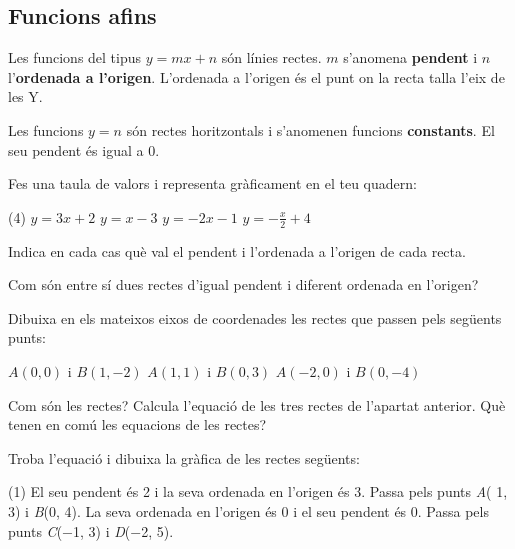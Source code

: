 \subsection{Funcions afins}	

\begin{theorybox}
	 Les funcions del tipus $y=mx+n$ són línies rectes. $m$ s'anomena \textbf{pendent} i $n$ l'\textbf{ordenada a l'origen}. L'ordenada a l'origen és el punt on la recta talla l'eix de les Y.
	
	Les funcions $y=n$ són rectes horitzontals i s'anomenen funcions \textbf{constants}.  El seu pendent és igual a 0.
	
\end{theorybox}

\begin{mylist}		
	\exer  Fes una taula de valors i representa gràficament en el teu quadern: 
	\begin{tasks}(4)
		\task \textbf{$y=3x+2$}
		\task \textbf{$y=x-3$}
		\task \textbf{$y=-2x-1$}
		\task \textbf{$y=-\frac{x}{2}+4$}
	\end{tasks}
Indica en cada cas què val el pendent i l'ordenada a l'origen de cada recta.


	\exer \mental Com són entre sí dues rectes d'igual pendent i diferent ordenada en l'origen?
	
	
	\exer  Dibuixa en els mateixos eixos de coordenades les rectes que passen pels següents punts:
	
	\begin{center}
	$A(0,0)$ i $B(1,-2)$  \quad \quad\quad \quad   $A(1,1)$ i $B(0,3)$    \quad \quad\quad \quad  $A(-2,0)$ i $B(0,-4)$
	\end{center}
	
	\begin{tasks}
		\task  Com són les rectes? 
		\task  Calcula l'equació de les tres rectes de l'apartat anterior. Què tenen en comú les equacions de les rectes?
	\end{tasks}

\answers[cols=1]{[Totes les rectes són paral·leles (i decreixents), $y=-2x$; $y=-2x+3$; $y=-2x-4$. Totes elles comparteixen el mateix pendent ($m=-2$) ]}


		
	\exer Troba l'equació i dibuixa la gràfica de les rectes següents:
	\begin{tasks}(1)
		\task   El seu pendent és 2 i la seva ordenada en l'origen és 3.
		\task   Passa pels punts \textit{A}( 1, 3) i \textit{B}(0, 4).
		\task   La seva ordenada en l'origen és 0 i el seu pendent és 0.
		\task   Passa pels punts \textit{C}($-$1, 3) i \textit{D}($-$2, 5).
	\end{tasks}
	


\end{mylist}
